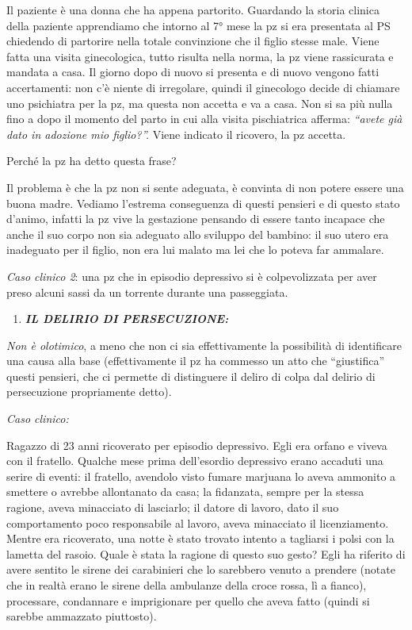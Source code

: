 \documentclass[]{article}
\begin{document}
Il paziente è una donna che ha appena partorito. Guardando la storia
clinica della paziente apprendiamo che intorno al 7° mese la pz si era
presentata al PS chiedendo di partorire nella totale convinzione che il
figlio stesse male. Viene fatta una visita ginecologica, tutto risulta
nella norma, la pz viene rassicurata e mandata a casa. Il giorno dopo di
nuovo si presenta e di nuovo vengono fatti accertamenti: non c'è niente
di irregolare, quindi il ginecologo decide di chiamare uno psichiatra
per la pz, ma questa non accetta e va a casa. Non si sa più nulla fino a
dopo il momento del parto in cui alla visita pischiatrica afferma:
\emph{``avete già dato in adozione mio figlio?''.} Viene indicato il
ricovero, la pz accetta.

Perché la pz ha detto questa frase?

Il problema è che la pz non si sente adeguata, è convinta di non potere
essere una buona madre. Vediamo l'estrema conseguenza di questi pensieri
e di questo stato d'animo, infatti la pz vive la gestazione pensando di
essere tanto incapace che anche il suo corpo non sia adeguato allo
sviluppo del bambino: il suo utero era inadeguato per il figlio, non era
lui malato ma lei che lo poteva far ammalare.

\emph{Caso clinico 2}: una pz che in episodio depressivo si è
colpevolizzata per aver preso alcuni sassi da un torrente durante una
passeggiata.

\begin{enumerate}
\def\labelenumi{\arabic{enumi}.}
\item
  \textbf{\emph{IL DELIRIO DI PERSECUZIONE:}}
\end{enumerate}

\emph{Non è olotimico}, a meno che non ci sia effettivamente la
possibilità di identificare una causa alla base (effettivamente il pz ha
commesso un atto che ``giustifica'' questi pensieri, che ci permette di
distinguere il deliro di colpa dal delirio di persecuzione propriamente
detto).

\emph{Caso clinico:}

Ragazzo di 23 anni ricoverato per episodio depressivo. Egli era orfano e
viveva con il fratello. Qualche mese prima dell'esordio depressivo erano
accaduti una serire di eventi: il fratello, avendolo visto fumare
marjuana lo aveva ammonito a smettere o avrebbe allontanato da casa; la
fidanzata, sempre per la stessa ragione, aveva minacciato di lasciarlo;
il datore di lavoro, dato il suo comportamento poco responsabile al
lavoro, aveva minacciato il licenziamento. Mentre era ricoverato, una
notte è stato trovato intento a tagliarsi i polsi con la lametta del
rasoio. Quale è stata la ragione di questo suo gesto? Egli ha riferito
di avere sentito le sirene dei carabinieri che lo sarebbero venuto a
prendere (notate che in realtà erano le sirene della ambulanze della
croce rossa, lì a fianco), processare, condannare e imprigionare per
quello che aveva fatto (quindi si sarebbe ammazzato piuttosto).
\end{document}
